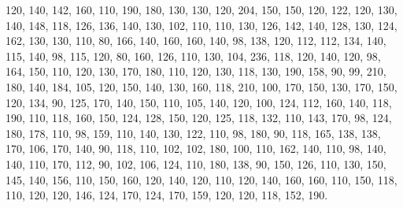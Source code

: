 \documentclass[twoside,leqno,11pt]{article}
\begin{document}
         120,
         140,
         142,
         160,
         110,
         190,
         180,
         130,
         130,
         120,
         204,
         150,
         150,
         120,
         122,
         120,
         130,
         140,
         148,
         118,
         126,
         136,
         140,
         130,
         102,
         110,
         110,
         130,
         126,
         142,
         140,
         128,
         130,
         124,
         162,
         130,
         130,
         110,
         80,
         166,
         140,
         160,
         160,
         140,
         98,
         138,
         120,
         112,
         112,
         134,
         140,
         115,
         140,
         98,
         115,
         120,
         80,
         160,
         126,
         110,
         130,
         104,
         236,
         118,
         120,
         140,
         120,
         98,
         164,
         150,
         110,
         120,
         130,
         170,
         180,
         110,
         120,
         130,
         118,
         130,
         190,
         158,
         90,
         99,
         210,
         180,
         140,
         184,
         105,
         120,
         150,
         140,
         130,
         160,
         118,
         210,
         100,
         170,
         150,
         130,
         170,
         150,
         120,
         134,
         90,
         125,
         170,
         140,
         150,
         110,
         105,
         140,
         120,
         100,
         124,
         112,
         160,
         140,
         118,
         190,
         110,
         118,
         160,
         150,
         124,
         128,
         150,
         120,
         125,
         118,
         132,
         110,
         143,
         170,
         98,
         124,
         180,
         178,
         110,
         98,
         159,
         110,
         140,
         130,
         122,
         110,
         98,
         180,
         90,
         118,
         165,
         138,
         138,
         170,
         106,
         170,
         140,
         90,
         118,
         110,
         102,
         102,
         180,
         100,
         110,
         162,
         140,
         110,
         98,
         140,
         140,
         110,
         170,
         112,
         90,
         102,
         106,
         124,
         110,
         180,
         138,
         90,
         150,
         126,
         110,
         130,
         150,
         145,
         140,
         156,
         110,
         150,
         160,
         120,
         140,
         120,
         110,
         120,
         140,
         160,
         160,
         110,
         150,
         118,
         110,
         120,
         120,
         146,
         124,
         170,
         124,
         170,
         159,
         120,
         120,
         118,
         152,
         190.
\end{document}
